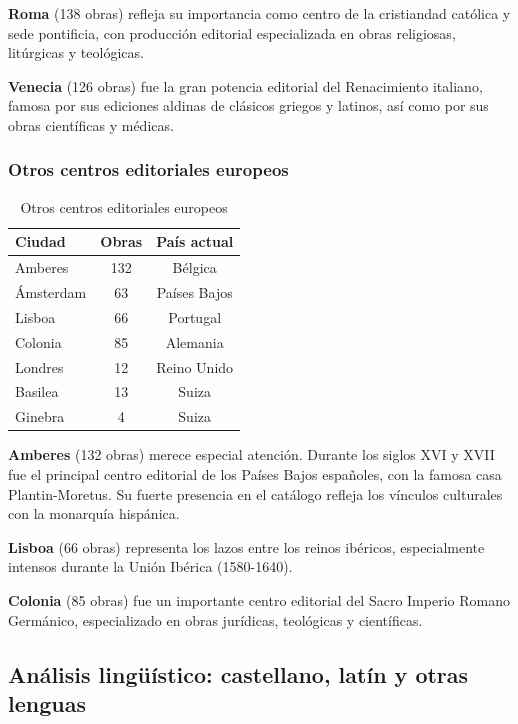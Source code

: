 \documentclass[12pt,a4paper]{article}
\begin{document}
\textbf{Roma} (138 obras) refleja su importancia como centro de la cristiandad católica y sede pontificia, con producción editorial especializada en obras religiosas, litúrgicas y teológicas.

\textbf{Venecia} (126 obras) fue la gran potencia editorial del Renacimiento italiano, famosa por sus ediciones aldinas de clásicos griegos y latinos, así como por sus obras científicas y médicas.

\subsubsection{Otros centros editoriales europeos}

\begin{table}[h]
\centering
\caption{Otros centros editoriales europeos}
\label{tab:otros}
\begin{tabular}{lcc}
\toprule
\textbf{Ciudad} & \textbf{Obras} & \textbf{País actual} \\
\midrule
Amberes & 132 & Bélgica \\
Ámsterdam & 63 & Países Bajos \\
Lisboa & 66 & Portugal \\
Colonia & 85 & Alemania \\
Londres & 12 & Reino Unido \\
Basilea & 13 & Suiza \\
Ginebra & 4 & Suiza \\
\bottomrule
\end{tabular}
\end{table}

\textbf{Amberes} (132 obras) merece especial atención. Durante los siglos XVI y XVII fue el principal centro editorial de los Países Bajos españoles, con la famosa casa Plantin-Moretus. Su fuerte presencia en el catálogo refleja los vínculos culturales con la monarquía hispánica.

\textbf{Lisboa} (66 obras) representa los lazos entre los reinos ibéricos, especialmente intensos durante la Unión Ibérica (1580-1640).

\textbf{Colonia} (85 obras) fue un importante centro editorial del Sacro Imperio Romano Germánico, especializado en obras jurídicas, teológicas y científicas.

\subsection{Análisis lingüístico: castellano, latín y otras lenguas}
\end{document}
